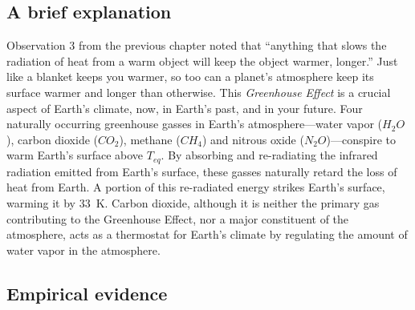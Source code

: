 \subsection{A brief explanation }
Observation 3 from the previous chapter noted that ``anything that slows the radiation of heat from a warm object will keep the object warmer, longer.'' Just like a blanket keeps you warmer, so too can a planet's atmosphere keep its surface warmer and longer than otherwise. This \emph{Greenhouse Effect} is a crucial aspect of Earth's climate, now, in Earth's past, and in your future. Four naturally occurring greenhouse gasses in Earth's atmosphere---water vapor ($H_2O$), carbon dioxide ($CO_2$), methane ($CH_4$) and nitrous oxide ($N_2O$)---conspire to warm Earth's surface above $T_{eq}$. By absorbing and re-radiating the infrared radiation emitted from Earth's surface, these gasses naturally retard the loss of heat from Earth. A portion of this re-radiated energy strikes Earth's surface, warming it by \SI{33}{\kelvin}. Carbon dioxide, although it is neither the primary gas contributing to the Greenhouse Effect, nor a major constituent of the atmosphere, acts as a thermostat for Earth's climate by regulating the amount of water vapor in the atmosphere. 
\subsection{Empirical evidence}
